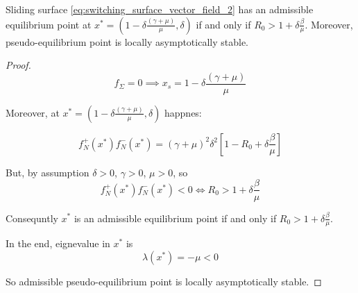 \begin{lemma}
\label{th:sliding_equilibria}
Sliding surface \ref{eq:switching_surface_vector_field_2} has an admissible equilibrium point at $x^*=(1-\delta\frac{\left(\gamma+\mu\right)}{\mu},\delta)$ if and only if $R_0 > 1+\delta\frac{\beta}{\mu}$. Moreover, pseudo-equilibrium point is locally asymptotically stable.
\end{lemma}

\begin{proof}
\begin{equation}
    f_\Sigma = 0 \implies x_s = 1-\delta\frac{\left(\gamma+\mu\right)}{\mu}
\end{equation}

Moreover, at $x^*=(1-\delta\frac{\left(\gamma+\mu\right)}{\mu},\delta)$ happnes:

\begin{equation}
    f^+_N(x^*)f^-_N(x^*) = (\gamma+\mu)^2\delta^2\left[1-R_0+\delta\frac{\beta}{\mu}\right]
\end{equation}

But, by assumption $\delta > 0$, $\gamma > 0$, $\mu > 0$, so
\begin{equation}
    f^+_N(x^*)f^-_N(x^*) < 0 \iff R_0 > 1+\delta\frac{\beta}{\mu}
\end{equation}

Consequntly $x^*$ is an admissible equilibrium point if and only if $R_0 > 1+\delta\frac{\beta}{\mu}$.

In the end, eignevalue in $x^*$ is
\begin{equation}
    \lambda(x^*) = -\mu < 0
\end{equation}

So admissible pseudo-equilibrium point is locally asymptotically stable.
\end{proof}